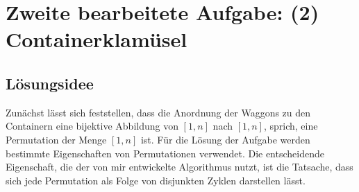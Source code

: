 \lstset{language=Scala}
\chapter[Zweite bearbeitete Aufgabe: (2) Containerklamüsel]{Zweite bearbeitete Aufgabe: \newline (2) Containerklamüsel}
\minitoc
\clearpage
\section{Lösungsidee}
Zunächst lässt sich feststellen,
dass die Anordnung der Waggons zu den Containern eine bijektive Abbildung von $[1,n]$ nach $[1,n]$, sprich, eine Permutation der Menge $[1,n]$ ist.
Für die Lösung der Aufgabe werden bestimmte Eigenschaften von Permutationen verwendet. 
Die entscheidende Eigenschaft, die der von mir entwickelte Algorithmus nutzt, ist die Tatsache,
dass sich jede Permutation als Folge von disjunkten Zyklen darstellen lässt.


